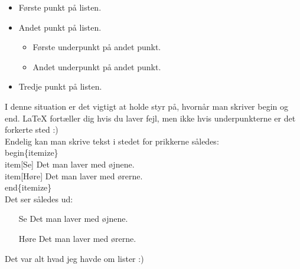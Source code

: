 \begin{itemize}
\item Første punkt på listen.
\item Andet punkt på listen.
\begin{itemize}
\item Første underpunkt på andet punkt.
\item Andet underpunkt på andet punkt.
\end{itemize}
\item Tredje punkt på listen.
\end{itemize}

\noindent
I denne situation er det vigtigt at holde styr på, hvornår man skriver \bs begin og \bs end. LaTeX fortæller dig hvis du laver fejl, men ikke hvis underpunkterne er det forkerte sted :)\\

\noindent
Endelig kan man skrive tekst i stedet for prikkerne således:\\

\indent \bs begin\{itemize\}\\
\indent \bs item[Se] Det man laver med øjnene.\\
\indent \bs item[Høre] Det man laver med ørerne.\\
\indent \bs end\{itemize\}\\

\noindent
Det ser således ud:

\begin{itemize}
\item[Se] Det man laver med øjnene.
\item[Høre] Det man laver med ørerne.
\end{itemize}

\noindent
Det var alt hvad jeg havde om lister :)